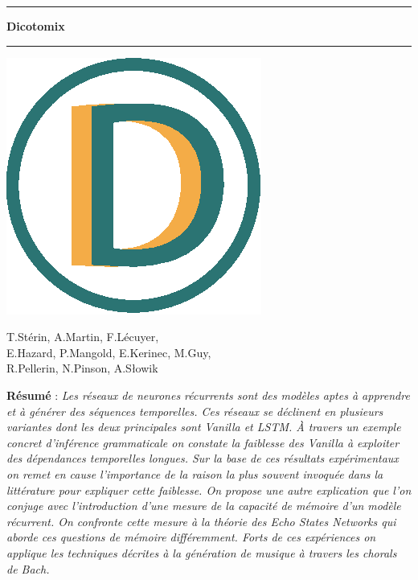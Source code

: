 \documentclass[11pt,a4paper]{article}
\theoremstyle{plain}
\theoremstyle{definition}
\begin{document}
\begin{center}


\vspace{1.5cm}

\rule[11pt]{5cm}{0.5pt}

\textbf{\huge Dicotomix}

\rule{5cm}{0.5pt}
\vspace{0.5cm}

\includegraphics[scale=0.7]{icon.eps}

\vspace{0.5cm}

T.Stérin, A.Martin, F.Lécuyer, \\ E.Hazard, P.Mangold, E.Kerinec, M.Guy, \\ R.Pellerin, N.Pinson, A.Słowik

\vspace{1.5cm}

\parbox{15cm}{\small
\textbf{Résumé} : \it Les réseaux de neurones récurrents sont des modèles aptes à apprendre et à générer des séquences temporelles. Ces réseaux se déclinent en plusieurs variantes dont les deux principales sont Vanilla et LSTM. À travers un exemple concret d'inférence grammaticale on constate la faiblesse des Vanilla à exploiter des dépendances temporelles longues. Sur la base de ces résultats expérimentaux on remet en cause l'importance de la raison la plus souvent invoquée dans la littérature pour expliquer cette faiblesse. On propose une autre explication que l'on conjuge avec l'introduction d'une mesure de la capacité de mémoire d'un modèle récurrent. On confronte cette mesure à la théorie des Echo States Networks qui aborde ces questions de mémoire différemment. Forts de ces expériences on applique les techniques décrites à la génération de musique à travers les chorals de Bach.

}
\end{center}
\end{document}
